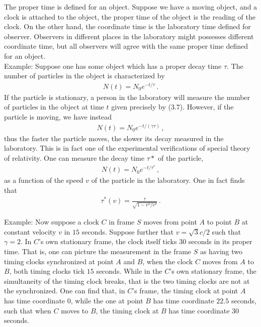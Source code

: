 \documentclass[11pt, onesided]{book}
\theoremstyle{break}
\theoremstyle{break}
\newcommand{\example}{\color{green}Example: \color{black}}
\begin{document}
The proper time is defined for an object. Suppose we have a moving object, and a clock is attached to the object, the proper time of the object is the reading of the clock. On the other hand, the coordinate time is the laboratory time defined for observer. Observers in different places in the laboratory might possesses different coordinate time, but all observers will agree with the same proper time defined for an object. \\

\example Suppose one has some object which has a proper decay time $\tau$. The number of particles in the object is characterized by
\begin{align}
N(t) = N_0 e^{-t/\tau}\,.
\end{align}
If the particle is stationary, a person in the laboratory will measure the number of particles in the object at time $t$ given precisely by (3.7). However, if the particle is moving, we have instead
\begin{align*}
N(t) = N_0 e^{-t/(\gamma\tau)}\,,
\end{align*}
thus the faster the particle moves, the slower its decay measured in the laboratory. This is in fact one of the experimental verifications of special theory of relativity. One can measure the decay time $\tau*$ of the particle,
\begin{align*}
N(t) = N_0 e^{-t/\tau^*}\,,
\end{align*}
as a function of the speed $v$ of the particle in the laboratory. One in fact finds that 
\begin{align*}
\tau^*(v) = \frac{\tau}{\sqrt{1 - v^2/c^2}}\,.
\end{align*}

\example Now suppose a clock $C$ in frame $S$ moves from point $A$ to point $B$ at constant velocity $v$ in $15$ seconds. Suppose further that $v = \sqrt{3}c/2 $ such that $\gamma = 2$. In $C$'s own stationary frame, the clock itself ticks $30$ seconds in its proper time. That is, one can picture the measurement in the frame $S$ as having two timing clocks synchronized at point $A$ and $B$, when the clock $C$ moves from $A$ to $B$, both timing clocks tick $15$ seconds. While in the $C$'s own stationary frame, the simultaneity of the timing clock breaks, that is the two timing clocks are not at the synchronized. One can find that, in $C$'s frame, the timing clock at point $A$ has time coordinate $0$, while the one at point $B$ has time coordinate $22.5$ seconds, such that when $C$ moves to $B$, the timing clock at $B$ has time coordinate $30$ seconds. \\
\end{document}
